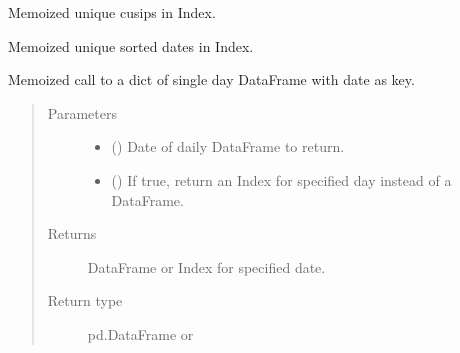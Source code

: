 \documentclass[letterpaper,10pt,english]{report}
\begin{document}
\begin{fulllineitems}

\begin{fulllineitems}
\label{\detokenize{index:lgimapy.index.Index.cusips}}
Memoized unique cusips in Index.

\end{fulllineitems}


\begin{fulllineitems}
Memoized unique sorted dates in Index.

\end{fulllineitems}


\begin{fulllineitems}
\label{\detokenize{index:lgimapy.index.Index.day}}
Memoized call to a dict of single day DataFrame
with date as key.
\begin{quote}\begin{description}
\item[{Parameters}] \leavevmode\begin{itemize}
\item {} 
 () \textendash{} Date of daily DataFrame to return.

\item {} 
 (\sphinxstyleliteralemphasis{\sphinxupquote{, }}) \textendash{} If true, return an Index for specified day instead
of a DataFrame.

\end{itemize}

\item[{Returns}] \leavevmode
{} \textendash{} DataFrame or Index for specified date.

\item[{Return type}] \leavevmode
pd.DataFrame or {\hyperref[\detokenize{index:lgimapy.index.Index}]{}}


\end{description}
\end{quote}
\end{fulllineitems}
\end{fulllineitems}
\end{document}
